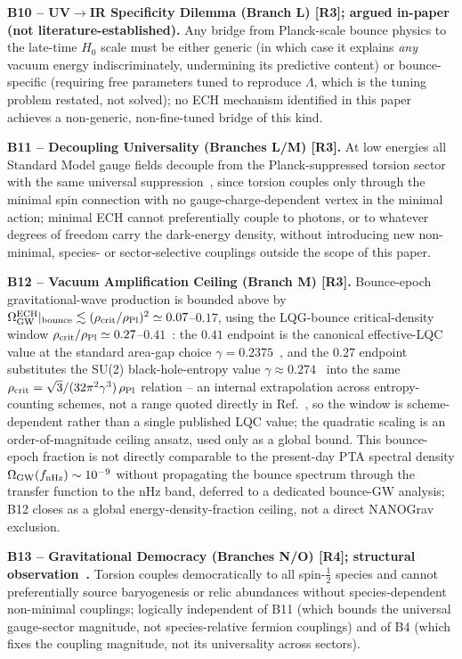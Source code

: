 \documentclass[aps,prd,twocolumn,superscriptaddress,preprintnumbers,nofootinbib,longbibliography,floatfix]{revtex4-2}
\newcommand{\rhocrit}{\rho_{\rm crit}}
\newcommand{\rhoPl}{\rho_{\rm Pl}}
\begin{document}
\medskip\noindent\textbf{B10 -- UV$\to$IR Specificity Dilemma (Branch L)
[R3]; argued in-paper (not literature-established).} Any bridge from Planck-scale bounce
physics to the late-time $H_0$ scale must be either generic (in which
case it explains \emph{any} vacuum energy indiscriminately, undermining
its predictive content) or bounce-specific (requiring free parameters
tuned to reproduce $\Lambda$, which is the tuning problem restated, not
solved); no ECH mechanism identified in this paper achieves a
non-generic, non-fine-tuned bridge of this kind.

\medskip\noindent\textbf{B11 -- Decoupling Universality (Branches L/M)
[R3].} At low energies all Standard Model gauge fields decouple from the
Planck-suppressed torsion sector with the same universal
suppression~\cite{Shapiro2002,BlagojevicHehl2013}, since torsion couples
only through the minimal spin connection with no gauge-charge-dependent
vertex in the minimal action;
minimal ECH cannot preferentially couple to photons, or to whatever
degrees of freedom carry the dark-energy density, without introducing
new non-minimal, species- or sector-selective couplings outside the
scope of this paper.

\medskip\noindent\textbf{B12 -- Vacuum Amplification Ceiling (Branch M)
[R3].} Bounce-epoch gravitational-wave production is bounded above by
$\Omega_{\rm GW}^{\rm ECH}|_{\rm bounce}\lesssim(\rhocrit/\rhoPl)^2
\simeq0.07$--$0.17$, using the LQG-bounce critical-density window
$\rhocrit/\rhoPl\simeq0.27$--$0.41$~\cite{Golden2026P1a}: the
$0.41$ endpoint is the canonical effective-LQC value at the standard
area-gap choice $\gamma=0.2375$~\cite{Ashtekar2011}, and the $0.27$
endpoint substitutes the SU(2) black-hole-entropy value
$\gamma\approx0.274$~\cite{GhoshMitra2005} into the same
$\rhocrit=\sqrt3/(32\pi^2\gamma^3)\,\rhoPl$ relation -- an internal
extrapolation across entropy-counting schemes, not a range quoted
directly in Ref.~\cite{Ashtekar2011}, so the window is scheme-dependent
rather than a single published LQC value; the quadratic scaling is an
order-of-magnitude ceiling ansatz, used only as a global bound. This
bounce-epoch fraction is not directly comparable to the present-day PTA
spectral density $\Omega_{\rm GW}(f_{\rm nHz})\sim10^{-9}$ without
propagating the bounce spectrum through the transfer function to the
nHz band, deferred to a dedicated bounce-GW analysis; B12 closes as a
global energy-density-fraction ceiling, not a direct NANOGrav exclusion.

\medskip\noindent\textbf{B13 -- Gravitational Democracy (Branches N/O)
[R4]; structural observation~\cite{Kibble1961,Sciama1964}.} Torsion couples democratically to all
spin-$\tfrac12$ species and cannot preferentially source baryogenesis or
relic abundances without species-dependent non-minimal couplings;
logically independent of B11 (which bounds the universal gauge-sector
magnitude, not species-relative fermion couplings) and of B4 (which
fixes the coupling magnitude, not its universality across sectors).
\end{document}
